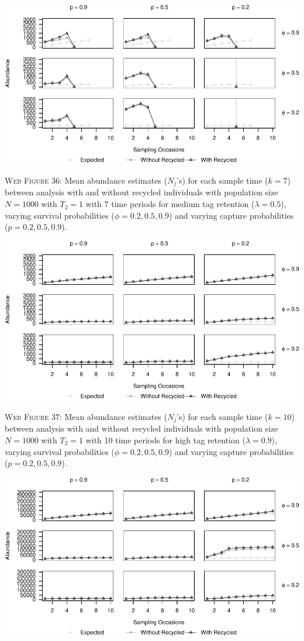 \documentclass[]{article}
\begin{document}
\includegraphics{Appendix_BW_files/figure-latex/36_abundance_M_GJSTL6-1.pdf}

\textsc{Web Figure 36:} Mean abundance estimates (\(N_j\)'s) for each
sample time (\(k=7\)) between analysis with and without recycled
individuals with population size \(N=1000\) with \(T_2=1\) with 7 time
periods for medium tag retention (\(\lambda=0.5\)), varying survival
probabilities (\(\phi=0.2,0.5,0.9\)) and varying capture probabilities
(\(p=0.2,0.5,0.9\)).

\newpage

\includegraphics{Appendix_BW_files/figure-latex/37_abundance_H_GJSTL1-1.pdf}

\textsc{Web Figure 37:} Mean abundance estimates (\(N_j\)'s) for each
sample time (\(k=10\)) between analysis with and without recycled
individuals with population size \(N=1000\) with \(T_2=1\) with 10 time
periods for high tag retention (\(\lambda=0.9\)), varying survival
probabilities (\(\phi=0.2,0.5,0.9\)) and varying capture probabilities
(\(p=0.2,0.5,0.9\)).

\includegraphics{Appendix_BW_files/figure-latex/38_abundance_H_GJSTL2-1.pdf}
\end{document}
